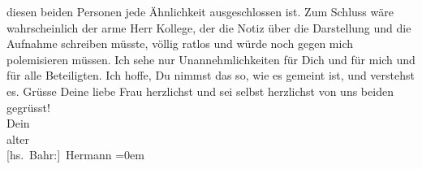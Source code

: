 \begin{ledgroupsized}[t]{13cm}
               diesen beiden Personen jede Ähnlichkeit ausgeschlossen ist. Zum Schluss wäre
               wahrscheinlich der arme Herr Kollege, der die Notiz über die Darstellung und die
               Aufnahme schreiben müsste, völlig ratlos und würde noch gegen mich polemisieren {\pb}müssen. Ich sehe nur Unannehmlichkeiten für Dich
               und für mich und für alle Beteiligten. Ich hoffe, Du nimmst das so, wie es gemeint
               ist, und verstehst es.\pend
           \pstart
           Grüsse Deine liebe Frau
               herzlichst und sei selbst herzlichst von uns beiden gegrüsst!{\\[\baselineskip]}Dein{\\[\baselineskip]}alter{\\[\baselineskip]}\spacefill\mbox{{[}hs. Bahr:{]} Hermann}\pend
           \leftskip=0em{}
         
         \endnumbering{}\end{ledgroupsized}  \newcommand{\dateiname}{L01980}\newcommand{\titel}{Hermann Bahr an Arthur Schnitzler, 15. 11. 1910}\newcommand{\editorInnen}{ Kurt Ifkovits,  Martin Anton Müller}
      